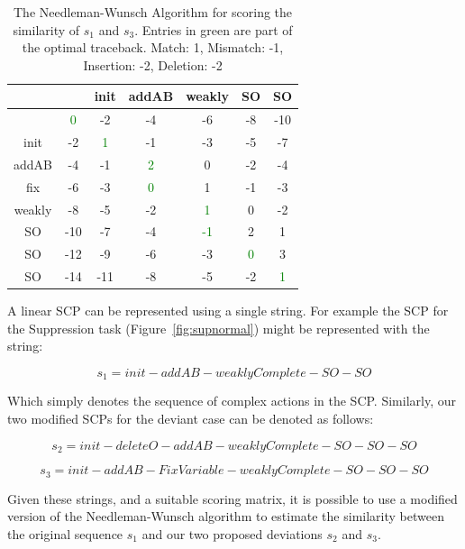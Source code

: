 \documentclass{article}
\begin{document}
\begin{table}
\begin{center}

\begin{tabular}{ c | c c c c c c}
& & init & addAB & weakly  & SO & SO \\ \hline
& \textcolor{green}{0}  & -2  & -4 & -6  & -8  & -10 \\

init & -2 & \textcolor{green}{1} & -1 & -3 & -5 & -7 \\

addAB & -4 & -1 & \textcolor{green}{2} & 0 & -2 & -4 \\

fix &-6 & -3 & \textcolor{green}{0} & 1 & -1 & -3  \\

weakly& -8& -5 & -2 & \textcolor{green}{1} & 0 & -2  \\

SO & -10& -7 & -4 & \textcolor{green}{-1} & 2 & 1  \\

SO & -12& -9 & -6 & -3 & \textcolor{green}{0} & 3  \\

SO & -14 & -11 & -8 & -5 & -2 & \textcolor{green}{1}  \\
 
\end{tabular}
\caption{The Needleman-Wunsch Algorithm for scoring the similarity of $s_1$ and $s_3$. Entries in green are part of the optimal traceback. Match: 1, Mismatch: -1, Insertion: -2, Deletion: -2}
\label{tbl:needs1s3}

\end{center}
\end{table}

A linear SCP can be represented using a single string. For example the SCP for the Suppression task (Figure~\ref{fig:supnormal}) might be represented with the string:

\[s_1=init-addAB-weaklyComplete-SO-SO\]

Which simply denotes the sequence of complex actions in the SCP. Similarly, our two modified SCPs for the deviant case can be denoted as follows:


\[s_2=init-deleteO-addAB-weaklyComplete-SO-SO-SO\]

\[s_3=init-addAB-FixVariable-weaklyComplete-SO-SO-SO\]

Given these strings, and a suitable scoring matrix, it is possible to use a modified version of the Needleman-Wunsch algorithm to estimate the similarity between the original sequence $s_1$ and our two proposed deviations $s_2$ and $s_3$.
\end{document}
